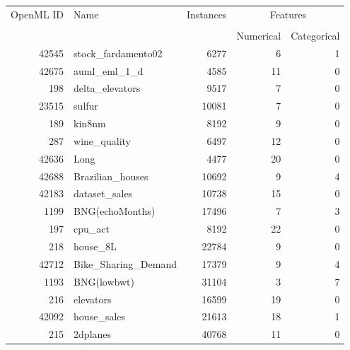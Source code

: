 \begin{table}
\centering
\begin{tabular}{rlrrr}
\toprule
\multirow{2}{*}{OpenML ID} & \multirow{2}{*}{Name} & \multirow{2}{*}{Instances} & \multicolumn{2}{c}{Features} \\ \cline{4-5}
\\[-0.75em]
&                       &                            & Numerical    & Categorical   \\
\midrule
     42545 &  stock\_fardamento02 &         6277 &                6 &                1 \\
     42675 &        auml\_eml\_1\_d &         4585 &               11 &                0 \\
       198 &     delta\_elevators &         9517 &                7 &                0 \\
     23515 &              sulfur &        10081 &                7 &                0 \\
       189 &              kin8nm &         8192 &                9 &                0 \\
       287 &        wine\_quality &         6497 &               12 &                0 \\
     42636 &                Long &         4477 &               20 &                0 \\
     42688 &    Brazilian\_houses &        10692 &                9 &                4 \\
     42183 &       dataset\_sales &        10738 &               15 &                0 \\
      1199 &     BNG(echoMonths) &        17496 &                7 &                3 \\
       197 &             cpu\_act &         8192 &               22 &                0 \\
       218 &            house\_8L &        22784 &                9 &                0 \\
     42712 & Bike\_Sharing\_Demand &        17379 &                9 &                4 \\
      1193 &         BNG(lowbwt) &        31104 &                3 &                7 \\
       216 &           elevators &        16599 &               19 &                0 \\
     42092 &         house\_sales &        21613 &               18 &                1 \\
       215 &            2dplanes &        40768 &               11 &                0 \\

\end{tabular}
\end{table}
